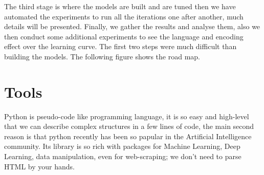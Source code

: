 \documentclass[12pt]{article}
\begin{document}
The third stage is where the models are built and are tuned then we have
automated the experiments to run all the iterations one after another, much
details will be presented. Finally, we gather the results and analyse them, also
we then conduct some additional experiments to see the language and encoding
effect over the learning curve.  The first two steps were much difficult than
building the models. The following figure shows the road map.

\begin{center}
\end{center}


\section{Tools}
Python is pseudo-code like programming language, it is so easy and high-level
that we can describe complex structures in a few lines of code, the main second
reason is that python recently has been so papular in the Artificial Intelligence
community. Its library is so rich with packages for Machine Learning, Deep
Learning, data manipulation, even for web-scraping; we don't need to parse HTML
by your hands.
\end{document}
